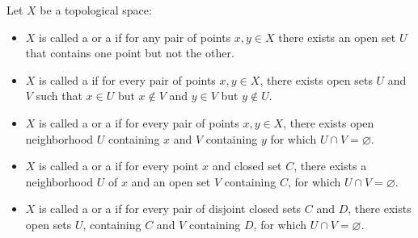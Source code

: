 \begin{dfn}\label{def:separation-axioms}
    Let \( X \) be a topological space:
    \begin{itemize}
        \item \( X \) is called a  or a  if for any pair of points \( x,y \in X \) there exists an open set \( U \) that contains one point but not the other.
        \item \( X \) is called a  if for every pair of points \( x,y \in X \), there exists open sets \( U \) and \( V \) such that \( x \in U  \) but \( x \not \in V \) and \( y \in V \) but \( y \not \in U \).
        \item \( X \) is called a  or a  if for every pair of points \( x,y \in X \), there exists open neighborhood \( U \) containing \( x \) and \( V \) containing \( y \) for which \( U \cap V = \varnothing \). 
        \item \( X \) is called a  or a   if for every point \( x \) and closed set \( C \), there exists a neighborhood \( U \) of \( x \) and an open set \( V \) containing \( C \), for which \( U \cap V =\varnothing \).
        \item \( X \) is called a  or a  if for every pair of disjoint closed sets \( C \) and \( D \), there exists open sets \( U \), containing \( C \) and \( V \) containing \( D \), for which \( U \cap V = \varnothing \).
    \end{itemize}
\end{dfn}